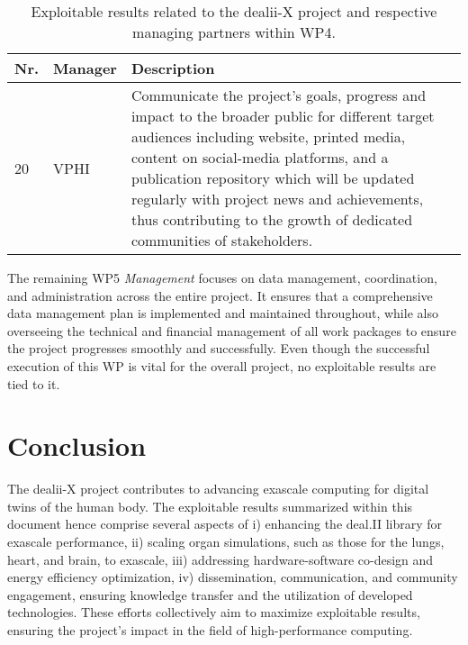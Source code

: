 \documentclass[a4paper,12pt]{article}
\begin{document}
\begin{center}
    \small
    \renewcommand{\arraystretch}{1.25}
    \begin{longtable}{|l|p{2.5cm}|p{12cm}|}
    \caption{Exploitable results related to the dealii-X project and respective managing partners within WP4.}
    \label{tab:exploitable_results_WP4}
    \\
    \hline
    \textbf{Nr.} & \textbf{Manager} & \textbf{Description} \\
    \hline
    20 & VPHI &
    Communicate the project's goals, progress and impact to the broader public for different target audiences including website, printed media, content on social-media platforms, and a publication repository which will be updated regularly with project news and achievements, thus contributing to the growth of dedicated communities of stakeholders.
    \\
    \hline
    \end{longtable}
\end{center}

The remaining WP5 \textit{Management} focuses on data management, coordination, and administration across the entire project. It ensures that a comprehensive data management plan is implemented and maintained throughout, while also overseeing the technical and financial management of all work packages to ensure the project progresses smoothly and successfully. Even though the successful execution of this WP is vital for the overall project, no exploitable results are tied to it.

\section{{Conclusion}} \label{sec:conclusion}

The dealii-X project contributes to advancing exascale computing for digital twins of the human body. The exploitable results summarized within this document hence comprise several aspects of i) enhancing the deal.II library for exascale performance, ii) scaling organ simulations, such as those for the lungs, heart, and brain, to exascale, iii) addressing hardware-software co-design and energy efficiency optimization, iv) dissemination, communication, and community engagement, ensuring knowledge transfer and the utilization of developed technologies. These efforts collectively aim to maximize exploitable results, ensuring the project’s impact in the field of high-performance computing.

\label{MyLastPage}
\end{document}
